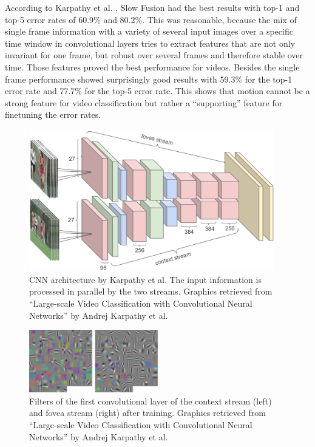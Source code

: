 \documentclass[12pt,twoside]{article}
\theoremstyle{plain}
\theoremstyle{definition}
\theoremstyle{remark}
\begin{document}
According to Karpathy et al. \cite{GoogleLargeScaleVideoClassification-Karpathy}, Slow Fusion had the best results with top-1 and top-5 error rates of 60.9\% and 80.2\%. This was reasonable, because the mix of single frame information with a variety of several input images over a specific time window in convolutional layers tries to extract features that are not only invariant for one frame, but robust over several frames and therefore stable over time.
Those features proved the best performance for videos. Besides the single frame performance showed surprisingly good results with 59.3\% for the top-1 error rate and 77.7\% for the top-5 error rate. This shows that motion cannot be a strong feature for video classification but rather a \enquote{supporting} feature for finetuning the error rates.

\begin{figure}
	\centerline{
		\includegraphics[width=0.95\textwidth]{google-architecture.png}
	}
	{\caption{CNN architecture by Karpathy et al. The input information is processed in parallel by the two streams. Graphics retrieved from \enquote{Large-scale Video Classification with Convolutional Neural Networks} by Andrej Karpathy et al. \cite{GoogleLargeScaleVideoClassification-Karpathy}}\label{fig:google-architecture-two-streams}}
\end{figure}

\begin{figure}
	\vspace{-15pt}
	\centerline{
		\includegraphics[width=0.5\textwidth]{GoogleVideoFilters.pdf}
	}
	{\caption{Filters of the first convolutional layer of the context stream (left) and fovea stream (right) after training. Graphics retrieved from \enquote{Large-scale Video Classification with Convolutional Neural Networks} by Andrej Karpathy et al. \cite{GoogleLargeScaleVideoClassification-Karpathy}}\label{fig:google-architecture-learned-filters}
		}
\end{figure}
\end{document}
